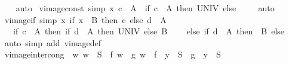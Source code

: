 \begin{isabellebody}
%
\isadelimproof
\ \ %
\endisadelimproof
%
\isatagproof
{}\isamarkupfalse%
\ auto%
\endisatagproof
{\isafoldproof}%
%
\isadelimproof
\isanewline
%
\endisadelimproof
\isanewline
{}\isamarkupfalse%
\ vimage{\isacharunderscore}{\kern0pt}const\ {\isacharbrackleft}{\kern0pt}simp{\isacharbrackright}{\kern0pt}{\isacharcolon}{\kern0pt}\ {\isachardoublequoteopen}{\isacharparenleft}{\kern0pt}{\isacharparenleft}{\kern0pt}{\isasymlambda}x{\isachardot}{\kern0pt}\ c{\isacharparenright}{\kern0pt}\ {\isacharminus}{\kern0pt}{\isacharbackquote}{\kern0pt}\ A{\isacharparenright}{\kern0pt}\ {\isacharequal}{\kern0pt}\ {\isacharparenleft}{\kern0pt}if\ c\ {\isasymin}\ A\ then\ UNIV\ else\ {\isacharbraceleft}{\kern0pt}{\isacharbraceright}{\kern0pt}{\isacharparenright}{\kern0pt}{\isachardoublequoteclose}\isanewline
%
\isadelimproof
\ \ %
\endisadelimproof
%
\isatagproof
{}\isamarkupfalse%
\ auto%
\endisatagproof
{\isafoldproof}%
%
\isadelimproof
\isanewline
%
\endisadelimproof
\isanewline
{}\isamarkupfalse%
\ vimage{\isacharunderscore}{\kern0pt}if\ {\isacharbrackleft}{\kern0pt}simp{\isacharbrackright}{\kern0pt}{\isacharcolon}{\kern0pt}\ {\isachardoublequoteopen}{\isacharparenleft}{\kern0pt}{\isacharparenleft}{\kern0pt}{\isasymlambda}x{\isachardot}{\kern0pt}\ if\ x\ {\isasymin}\ B\ then\ c\ else\ d{\isacharparenright}{\kern0pt}\ {\isacharminus}{\kern0pt}{\isacharbackquote}{\kern0pt}\ A{\isacharparenright}{\kern0pt}\ {\isacharequal}{\kern0pt}\isanewline
\ \ \ {\isacharparenleft}{\kern0pt}if\ c\ {\isasymin}\ A\ then\ {\isacharparenleft}{\kern0pt}if\ d\ {\isasymin}\ A\ then\ UNIV\ else\ B{\isacharparenright}{\kern0pt}\isanewline
\ \ \ \ else\ if\ d\ {\isasymin}\ A\ then\ {\isacharminus}{\kern0pt}\ B\ else\ {\isacharbraceleft}{\kern0pt}{\isacharbraceright}{\kern0pt}{\isacharparenright}{\kern0pt}{\isachardoublequoteclose}\isanewline
%
\isadelimproof
\ \ %
\endisadelimproof
%
\isatagproof
{}\isamarkupfalse%
\ {\isacharparenleft}{\kern0pt}auto\ simp\ add{\isacharcolon}{\kern0pt}\ vimage{\isacharunderscore}{\kern0pt}def{\isacharparenright}{\kern0pt}%
\endisatagproof
{\isafoldproof}%
%
\isadelimproof
\isanewline
%
\endisadelimproof
\isanewline
{}\isamarkupfalse%
\ vimage{\isacharunderscore}{\kern0pt}inter{\isacharunderscore}{\kern0pt}cong{\isacharcolon}{\kern0pt}\ {\isachardoublequoteopen}{\isacharparenleft}{\kern0pt}{\isasymAnd}\ w{\isachardot}{\kern0pt}\ w\ {\isasymin}\ S\ {\isasymLongrightarrow}\ f\ w\ {\isacharequal}{\kern0pt}\ g\ w{\isacharparenright}{\kern0pt}\ {\isasymLongrightarrow}\ f\ {\isacharminus}{\kern0pt}{\isacharbackquote}{\kern0pt}\ y\ {\isasyminter}\ S\ {\isacharequal}{\kern0pt}\ g\ {\isacharminus}{\kern0pt}{\isacharbackquote}{\kern0pt}\ y\ {\isasyminter}\ S{\isachardoublequoteclose}\isanewline

\end{isabellebody}
